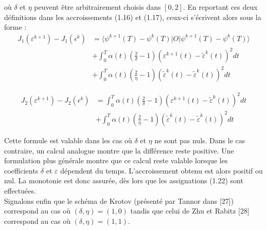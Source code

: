 où $\delta$ et $\eta$ peuvent être arbitrairement choisis dans $[0, 2]$. En reportant ces deux définitions dans les accroissements (1.16) et (1.17), ceux-ci s’écrivent alors sous la forme :
\begin{align*}
J_1(\varepsilon^{k+1})-J_1(\epsilon^k) &= \langle \psi^{k+1}(T) - \psi^k(T)|O|\psi^{k+1}(T) - \psi^k(T)\rangle\\
\quad & + \int_0^T \alpha(t)(\frac{2}{\delta} - 1)(\varepsilon^{k+1}(t) - \tilde{\varepsilon}^k(t))^2dt\\
 \quad & + \int_0^T \alpha(t)(\frac{2}{\eta} - 1)(\tilde{\varepsilon}^k(t) - \tilde{\varepsilon}^k(t))^2dt
\end{align*}

\begin{align*}
J_2(\varepsilon^{k+1})-J_2(\epsilon^k) &=  \int_0^T \alpha(t)(\frac{2}{\delta} - 1)(\varepsilon^{k+1}(t) - \tilde{\varepsilon}^k(t))^2dt\\
 \quad & + \int_0^T \alpha(t)(\frac{2}{\eta} - 1)(\tilde{\varepsilon}^k(t) - \tilde{\varepsilon}^k(t))^2dt
\end{align*}

Cette formule est valable dans les cas où $\delta$ et $\eta$ ne sont pas nuls. Dans le cas contraire, un calcul analogue montre que la différence reste positive. Une formulation plus générale montre que ce calcul reste valable lorsque les coefficients $\delta$ et $\varepsilon$ dépendent du temps.
L'accroissement obtenu est alors positif ou nul. La monotonie est donc assurée, dès lors que les assignations (1.22) sont effectuées.
\\Signalons enfin que le schéma de Krotov (présenté par Tannor dans [27]) correspond au cas où $(\delta,\eta)= (1, 0)$ tandis que celui de Zhu et Rabitz [28] correspond au cas où $(\delta,\eta)= (1, 1)$.

